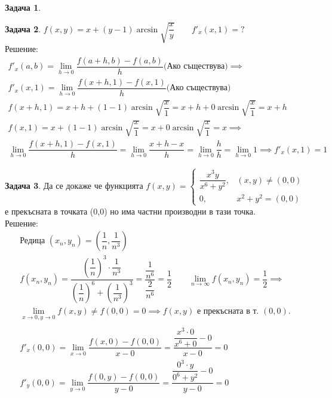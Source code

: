 \documentclass[a4paper,fleqn,12pt]{article}
\theoremstyle{definition}
\newtheorem{task}{Задача}[subsection]
\begin{document}
\begin{task}
\begin{enumerate}
\end{enumerate}

\end{task}

\begin{task}
$f(x,y) = x + (y-1)\arcsin{\sqrt{\dfrac{x}{y}}}\qquad f'_x(x,1) = ?$\\ 
Решение:
\begin{gather*}
f'_x (a,b) = \lim\limits_{h \to 0} \dfrac{f(a +h,b) - f(a,b)}{h} \text{(Ако съществува)} \implies \\
f'_x(x,1) =  \lim\limits_{h \to 0} \dfrac{f(x +h,1) - f(x,1)}{h} \text{(Ако съществува)}\\
f(x +h,1) = x + h + (1-1)\arcsin{\sqrt{\dfrac{x}{1}}} = x + h + 0 \arcsin{\sqrt{\dfrac{x}{1}}} =  x + h \\
f(x,1) = x + (1-1)\arcsin{\sqrt{\dfrac{x}{1}}} = x + 0 \arcsin{\sqrt{\dfrac{x}{1}}} =  x \implies \\
\lim\limits_{h \to 0} \dfrac{f(x +h,1) - f(x,1)}{h} =  \lim\limits_{h \to 0} \dfrac{x + h - x}{h} = \lim\limits_{h \to 0} \dfrac{h}{h} =  \lim\limits_{h \to 0} 1 \implies f'_x(x,1) = 1
\end{gather*}
\end{task}

\begin{task}
Да се докаже че функцията $f(x,y) = 
\begin{cases}
\dfrac{x^3y}{x^6 + y^2}, & (x,y) \neq (0,0)  \\
0, & x^2 + y^2 = (0,0) 
\end{cases}
$ е прекъсната в точката (0,0) но има частни производни в тази точка. \\
Решение:
\begin{gather*}
\text{Редица } (x_n, y_n) = \left(\dfrac{1}{n}, \dfrac{1}{n^3} \right) \\
f(x_n, y_n) = \dfrac{ \left( \dfrac{1}{n} \right)^3 \cdot \dfrac{1}{n^3}}{\left( \dfrac{1}{n}\right)^6 + \left( \dfrac{1}{n^3} \right)^3 } = \dfrac{\dfrac{1}{n^6}}{\dfrac{2}{n^6}} = \dfrac{1}{2} \qquad \lim\limits_{n \to \infty} f(x_n, y_n) = \dfrac{1}{2}  \implies \\
\lim\limits_{x \to 0, y \to 0 } f(x, y) \neq f(0,0) = 0 \implies f(x, y) \text{ е прекъсната в т. }(0,0).\\
\\
f'_x (0,0) = \lim\limits_{x \to 0} \dfrac{f(x,0) - f(0,0)}{x - 0} = \dfrac{ \dfrac{x^3 \cdot 0}{x^6 + 0} - 0}{x - 0} = 0 \\
f'_y (0,0) = \lim\limits_{y \to 0} \dfrac{f(0,y) - f(0,0)}{y - 0} = \dfrac{\dfrac{0^3 \cdot y}{0^6 + y^2} - 0}{y - 0} = 0
\end{gather*}
\end{task}
\end{document}
